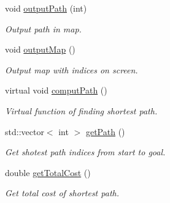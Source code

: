 \begin{DoxyCompactItemize}
void \hyperlink{classPathFindingAlgorithm_a98a59e7a6797895ac08be283850ab534}{output\-Path} (int)
\begin{DoxyCompactList}\small\item\em Output path in map. \end{DoxyCompactList}\item 
void \hyperlink{classPathFindingAlgorithm_a836f5c7fd0ea0e2201ed954f55ca523b}{output\-Map} ()
\begin{DoxyCompactList}\small\item\em Output map with indices on screen. \end{DoxyCompactList}\item 
virtual void \hyperlink{classPathFindingAlgorithm_adbd9dfe9d49577e9420669f59c290f55}{comput\-Path} ()
\begin{DoxyCompactList}\small\item\em Virtual function of finding shortest path. \end{DoxyCompactList}\item 
std\-::vector$<$ int $>$ \hyperlink{classPathFindingAlgorithm_a2c614eeead913e62288faa5499467529}{get\-Path} ()
\begin{DoxyCompactList}\small\item\em Get shotest path indices from start to goal. \end{DoxyCompactList}\item 
double \hyperlink{classPathFindingAlgorithm_a0c0eaaa84d7739a3c09ad012b37e8bd9}{get\-Total\-Cost} ()
\begin{DoxyCompactList}\small\item\em Get total cost of shortest path. \end{DoxyCompactList}\end{DoxyCompactItemize}
